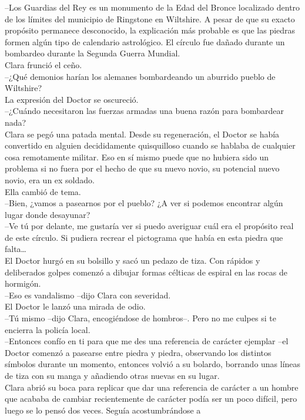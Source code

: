 --Los Guardias del Rey es un monumento de la Edad del Bronce localizado
dentro de los límites del municipio de Ringstone en Wiltshire. A pesar
de que su exacto propósito permanece desconocido, la explicación más
probable es que las piedras formen algún tipo de calendario astrológico.
El círculo fue dañado durante un bombardeo durante la Segunda Guerra
Mundial.\\
Clara frunció el ceño.\\
--¿Qué demonios harían los alemanes bombardeando un aburrido pueblo de
Wiltshire?\\
La expresión del Doctor se oscureció.\\
--¿Cuándo necesitaron las fuerzas armadas una buena razón para
bombardear nada?\\
Clara se pegó una patada mental. Desde su regeneración, el Doctor se
había convertido en alguien decididamente quisquilloso cuando se hablaba
de cualquier cosa remotamente militar. Eso en sí mismo puede que no
hubiera sido un problema si no fuera por el hecho de que su nuevo novio,
su potencial nuevo novio, era un ex soldado.\\
Ella cambió de tema.\\
--Bien, ¿vamos a pasearnos por el pueblo? ¿A ver si podemos encontrar
algún lugar donde desayunar?\\
--Ve tú por delante, me gustaría ver si puedo averiguar cuál era el
propósito real de este círculo. Si pudiera recrear el pictograma que
había en esta piedra que falta\ldots{}\\
El Doctor hurgó en su bolsillo y sacó un pedazo de tiza. Con rápidos y
deliberados golpes comenzó a dibujar formas célticas de espiral en las
rocas de hormigón.\\
--Eso es vandalismo --dijo Clara con severidad.\\
El Doctor le lanzó una mirada de odio.\\
--Tú mismo --dijo Clara, encogiéndose de hombros--. Pero no me culpes si
te encierra la policía local.\\
--Entonces confío en ti para que me des una referencia de carácter
ejemplar --el Doctor comenzó a pasearse entre piedra y piedra,
observando los distintos símbolos durante un momento, entonces volvió a
su bolardo, borrando unas líneas de tiza con su manga y añadiendo otras
nuevas en su lugar.\\
Clara abrió su boca para replicar que dar una referencia de carácter a
un hombre que acababa de cambiar recientemente de carácter podía ser un
poco difícil, pero luego se lo pensó dos veces. Seguía acostumbrándose a

